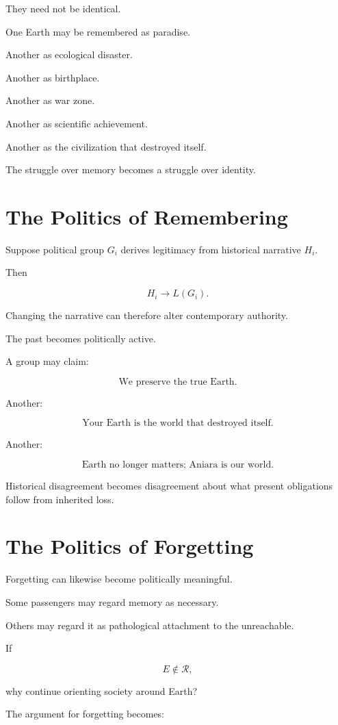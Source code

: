 \documentclass[11pt,oneside]{book}
\theoremstyle{definition}
\theoremstyle{remark}
\newcommand{\R}{\mathcal{R}}
\begin{document}
They need not be identical.

One Earth may be remembered as paradise.

Another as ecological disaster.

Another as birthplace.

Another as war zone.

Another as scientific achievement.

Another as the civilization that destroyed itself.

The struggle over memory becomes a struggle over identity.

\section{The Politics of Remembering}

Suppose political group \(G_i\) derives legitimacy from historical narrative \(H_i\).

Then

\[
H_i
\rightarrow
L(G_i).
\]

Changing the narrative can therefore alter contemporary authority.

The past becomes politically active.

A group may claim:

\[
\text{We preserve the true Earth.}
\]

Another:

\[
\text{Your Earth is the world that destroyed itself.}
\]

Another:

\[
\text{Earth no longer matters; Aniara is our world.}
\]

Historical disagreement becomes disagreement about what present obligations follow from inherited loss.

\section{The Politics of Forgetting}

Forgetting can likewise become politically meaningful.

Some passengers may regard memory as necessary.

Others may regard it as pathological attachment to the unreachable.

If

\[
E\notin\R,
\]

why continue orienting society around Earth?

The argument for forgetting becomes:
\end{document}
